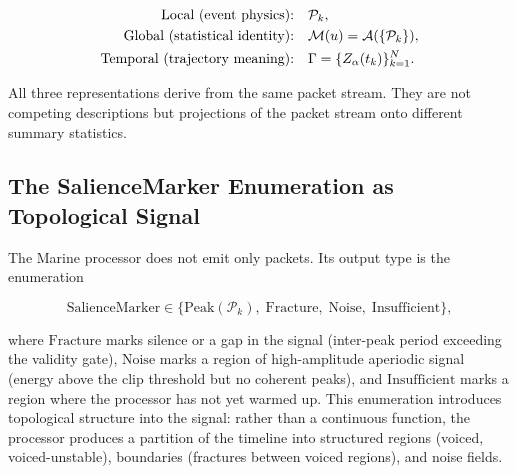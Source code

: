 \documentclass[12pt, a4paper]{article}
\begin{document}
\begin{align}
\text{Local (event physics):} \quad &\mathcal{P}_k, \notag\\
\text{Global (statistical identity):} \quad &\mathcal{M}(u) = \mathcal{A}(\{\mathcal{P}_k\}), \label{eq:hierarchy}\\
\text{Temporal (trajectory meaning):} \quad &\Gamma = \{Z_\alpha(t_k)\}_{k=1}^N. \notag
\end{align}

All three representations derive from the same packet stream. They are not competing descriptions but projections of the packet stream onto different summary statistics.

\subsection{The SalienceMarker Enumeration as Topological Signal}

The Marine processor does not emit only packets. Its output type is the enumeration

\begin{equation}
\mathrm{SalienceMarker} \in \{\mathrm{Peak}(\mathcal{P}_k),\; \mathrm{Fracture},\; \mathrm{Noise},\; \mathrm{Insufficient}\},
\label{eq:marker}
\end{equation}

where $\mathrm{Fracture}$ marks silence or a gap in the signal (inter-peak period exceeding the validity gate), $\mathrm{Noise}$ marks a region of high-amplitude aperiodic signal (energy above the clip threshold but no coherent peaks), and $\mathrm{Insufficient}$ marks a region where the processor has not yet warmed up. This enumeration introduces topological structure into the signal: rather than a continuous function, the processor produces a partition of the timeline into structured regions (voiced, voiced-unstable), boundaries (fractures between voiced regions), and noise fields.
\end{document}
